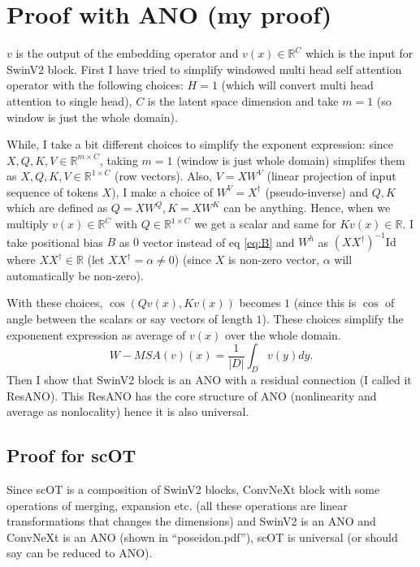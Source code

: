 \documentclass[reqno,10pt]{amsart}
\theoremstyle{plain}
\theoremstyle{definition}
\newcommand{\bb}[1]{\mathbb{#1}}
\begin{document}
\section{Proof with ANO (my proof)}

$v$ is the output of the embedding operator and $v(x) \in \bb R^C$ which is the input for SwinV2 block. First I have tried to simplify windowed multi head self attention operator with the following choices: $H=1$ (which will convert multi head attention to single head), $C$ is the latent space dimension and take $m=1$ (so window is just the whole domain).

While, I take a bit different choices to simplify the exponent expression: since $X,Q,K,V \in \bb R^{m\times C}$, taking $m=1$ (window is just whole domain) simplifes them as $X,Q,K,V \in \bb R^{1\times C}$ (row vectors). Also, $V = XW^V$ (linear projection of input sequence of tokens $X$), I make a choice of $W^V = X^\dagger$ (pseudo-inverse) and $Q,K$ which are defined as $Q=XW^Q, K = XW^K$ can be anything. Hence, when we multiply $v(x) \in \bb R^C$ with $Q \in \bb R^{1\times C}$ we get a scalar and same for $Kv(x) \in \bb R$. I take positional bias $B$ as $0$ vector instead of eq \ref{eq:B} and $W^h$ as $(XX^\dagger)^{-1} \text{Id}$ where $XX^\dagger \in \bb R$ (let $XX^\dagger = \alpha \neq 0$) (since $X$ is non-zero vector, $\alpha$ will automatically be non-zero).

With these choices, $\cos(Qv(x),Kv(x))$ becomes $1$ (since this is $\cos$ of angle between the scalars or say vectors of length $1$). These choices simplify the exponenent expression as average of $v(x)$ over the whole domain.
$$ W-MSA(v)(x) = \frac{1}{|D|} \int_D v(y) dy.$$
Then I show that SwinV2 block is an ANO with a residual connection (I called it ResANO). This ResANO has the core structure of ANO (nonlinearity and average as nonlocality) hence it is also universal.
\subsection{Proof for scOT}
Since scOT is a composition of SwinV2 blocks, ConvNeXt block with some operations of merging, expansion etc. (all these operations are linear transformations that changes the dimensions) and SwinV2 is an ANO and ConvNeXt is an ANO (shown in ``poseidon.pdf''), scOT is universal (or should say can be reduced to ANO).



\end{document}
